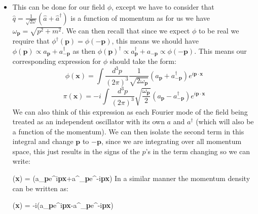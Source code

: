 \documentclass[11pt]{article}
\renewenvironment{flalign}{\vspace{-2mm}\empheq[box=\tcbhighmath]{align}}{\endempheq}
\numberwithin{equation}{section}
\begin{document}
\begin{itemize}
\item This can be done for our field $\phi$, except we have to consider that $\hat{q} = \frac{1}{\sqrt{2 \omega}}(\hat{a}+\hat{a}^{\dagger})$ is a function of momentum as for us we have $\omega_{\textbf{p}} = \sqrt{p^2+m^2}$. We can then recall that since we expect $\phi$ to be real we require that $\phi^{\dagger}(\textbf{p}) = \phi(-\textbf{p})$, this means we should have $\phi(\textbf{p}) \propto a_{\textbf{p}}+a^{\dagger}_{-\textbf{p}}$ as then $\phi(\textbf{p})^{\dagger} \propto a_{\textbf{p}}^{\dagger}+ a_{-\textbf{p}} \propto \phi(-\textbf{p})$. This means our corresponding expression for $\phi$ should take the form:
\begin{equation}
\label{phi_1}
  \phi(\textbf{x}) = \int \frac{d^3p}{(2\pi)^3}\frac{1}{\sqrt{2\omega_{\textbf{p}}}}\left(a_{\textbf{p}}+a^{\dagger}_{-\textbf{p}}\right)e^{i\textbf{p}\cdot\textbf{x}} 
\end{equation} 
\begin{equation}
\label{pi_1}
  \pi(\textbf{x}) = -i\int \frac{d^3p}{(2\pi)^3}\sqrt{\frac{\omega_{\textbf{p}}}{2}}\left(a_{\textbf{p}}-a^{\dagger}_{-\textbf{p}}\right)e^{i\textbf{p}\cdot\textbf{x}} 
\end{equation} 
We can also think of this expression as each Fourier mode of the field being treated as an independent oscillator with its own $a$ and $a^{\dagger}$ (which will also be a function of the momentum). We can then isolate the second term in this integral and change $\textbf{p}$ to $-\textbf{p}$, since we are integrating over all momentum space, this just results in the signs of the $p$'s in the term changing so we can write:

\begin{flalign}
\label{phi_2}
  \phi(\textbf{x}) = \int {}\left(a_{\textbf{p}}e^{i\textbf{p}\cdot\textbf{x}}+a^{\dagger}_{\textbf{p}}e^{-i\textbf{p}\cdot\textbf{x}}\right) 
\end{flalign}
In a similar manner the momentum density can be written as:

\begin{flalign}
\label{pi_2}
  \pi(\textbf{x}) = -i\int {}\left(a_{\textbf{p}}e^{i\textbf{p}\cdot\textbf{x}}-a^{\dagger}_{\textbf{p}}e^{-i\textbf{p}\cdot\textbf{x}}\right) 
\end{flalign}
\end{itemize}
\end{document}
